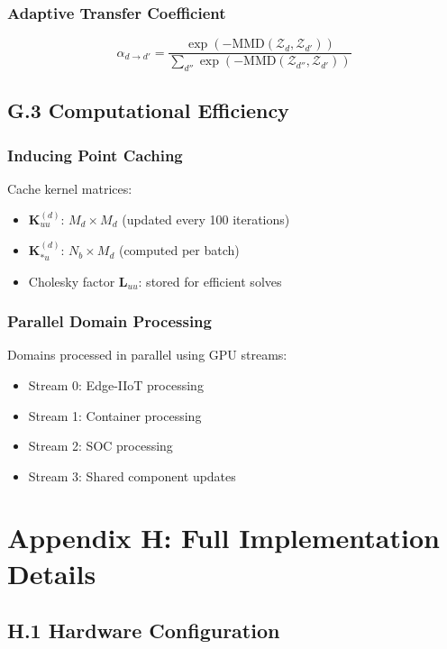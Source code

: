 \documentclass[12pt]{article}
\begin{document}
\subsubsection{Adaptive Transfer Coefficient}
\begin{equation}
\alpha_{d \to d'} = \frac{\exp(-\text{MMD}(\mathcal{Z}_d, \mathcal{Z}_{d'}))}{\sum_{d''} \exp(-\text{MMD}(\mathcal{Z}_{d''}, \mathcal{Z}_{d'}))}
\end{equation}

\subsection{G.3 Computational Efficiency}

\subsubsection{Inducing Point Caching}
Cache kernel matrices:
\begin{itemize}
\item $\mathbf{K}_{uu}^{(d)}$: $M_d \times M_d$ (updated every 100 iterations)
\item $\mathbf{K}_{*u}^{(d)}$: $N_b \times M_d$ (computed per batch)
\item Cholesky factor $\mathbf{L}_{uu}$: stored for efficient solves
\end{itemize}

\subsubsection{Parallel Domain Processing}
Domains processed in parallel using GPU streams:
\begin{itemize}
\item Stream 0: Edge-IIoT processing
\item Stream 1: Container processing
\item Stream 2: SOC processing
\item Stream 3: Shared component updates
\end{itemize}

\section{Appendix H: Full Implementation Details}

\subsection{H.1 Hardware Configuration}
\end{document}
